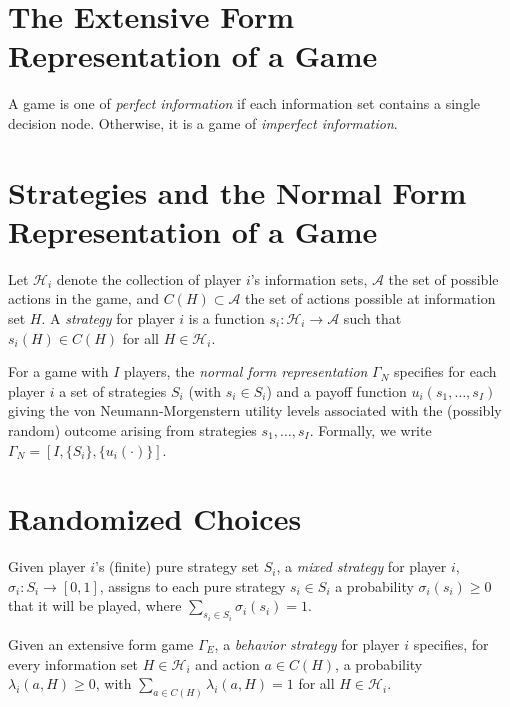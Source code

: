 \addtocounter{section}{1}

\addtocounter{section}{1}


\section{The Extensive Form Representation of a Game}

\begin{defn}
    A game is one of \emph{perfect information} if each information set contains a single decision node. Otherwise, it is a game of \emph{imperfect information}.
\end{defn}


\section{Strategies and the Normal Form Representation of a Game}

\begin{defn}
    Let $\mathscr{H}_i$ denote the collection of player $i$'s information sets, $\mathscr{A}$ the set of possible actions in the game, and $C(H) \subset \mathscr{A}$ the set of actions possible at information set $H$. A \emph{strategy} for player $i$ is a function $s_i : \mathscr{H}_i \to \mathscr{A}$ such that $s_i(H) \in C(H)$ for all $H \in \mathscr{H}_i$.
\end{defn}

\begin{defn}
    For a game with $I$ players, the \emph{normal form representation} $\Gamma_N$ specifies for each player $i$ a set of strategies $S_i$ (with $s_i \in S_i$) and a payoff function $u_i(s_1, \dots, s_I)$ giving the von Neumann-Morgenstern utility levels associated with the (possibly random) outcome arising from strategies $s_1, \dots, s_I$. Formally, we write $\Gamma_N = [I, \{S_i\}, \{u_i(\cdot)\}]$.
\end{defn}


\section{Randomized Choices}

\begin{defn}
    Given player $i$'s (finite) pure strategy set $S_i$, a \emph{mixed strategy} for player $i$, $\sigma_i : S_i \to [0, 1]$, assigns to each pure strategy $s_i \in S_i$ a probability $\sigma_i(s_i) \geq 0$ that it will be played, where $\sum_{s_i \in S_i} \sigma_i(s_i) = 1$.
\end{defn}

\begin{defn}
    Given an extensive form game $\Gamma_E$, a \emph{behavior strategy} for player $i$ specifies, for every information set $H \in \mathscr{H}_i$ and action $a \in C(H)$, a probability $\lambda_i(a, H) \geq 0$, with $\sum_{a \in C(H)} \lambda_i(a, H) = 1$ for all $H \in \mathscr{H}_i$.
\end{defn}
